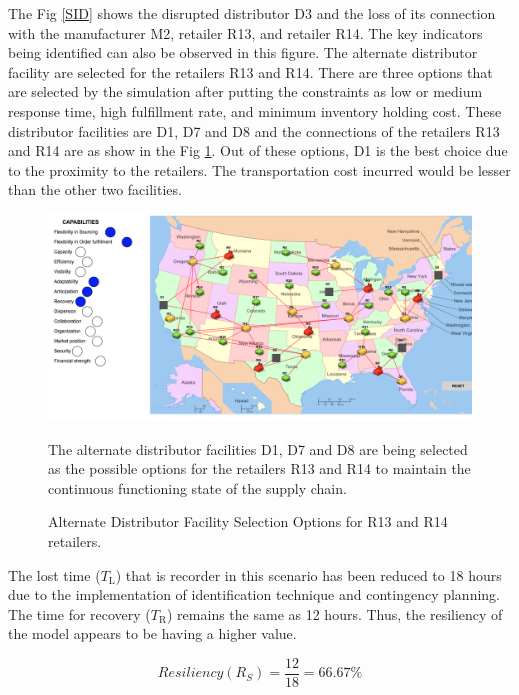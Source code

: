 The Fig \ref{SID} shows the disrupted distributor D3 and the loss of its connection with the manufacturer M2, retailer R13, and retailer R14. The key indicators being identified can also be observed in this figure. The alternate distributor facility are selected for the retailers R13 and R14. There are three options that are selected by the simulation after putting the constraints as low or medium response time, high fulfillment rate, and minimum inventory holding cost. These distributor facilities are D1, D7 and D8 and the connections of the retailers R13 and R14 are as show in the Fig \ref{ALTD}. Out of these options, D1 is the best choice due to the proximity to the retailers. The transportation cost incurred would be lesser than the other two facilities.                                                            

\begin{figure}[H]
  \centering
  \includegraphics[width=6.5in]{figures/pdf/ALTD.png}\\
  \caption{Alternate Distributor Facility Selection Options for R13 and R14 retailers.}
  {The alternate distributor facilities D1, D7 and D8 are being selected as the possible options for the retailers R13 and R14 to maintain the continuous functioning state of the supply chain.}
  \label{ALTD}
\end{figure}                                                                                                            The lost time ($T_{\text{L}}$)  that is recorder in this scenario has been reduced to 18 hours due to the implementation of identification technique and contingency planning. The time for recovery ($T_{\text{R}}$) remains the same as 12 hours. Thus, the resiliency of the model appears to be having a higher value.

\begin{equation}
    Resiliency(R_S) = \frac{12}{18} = 66.67 \% \label{3.17}
\end{equation}

